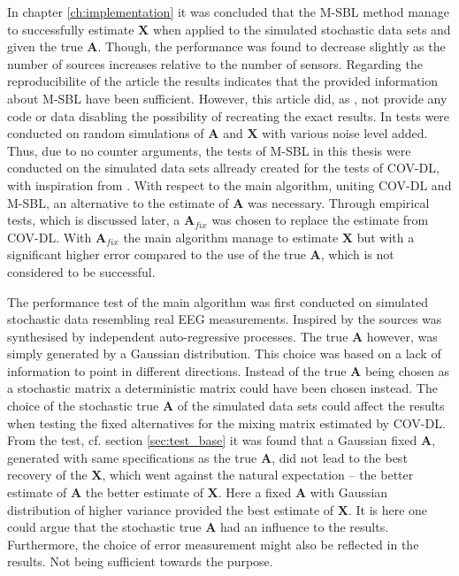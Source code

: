 In chapter \ref{ch:implementation} it was concluded that the M-SBL method manage to successfully estimate $\textbf{X}$ when applied to the  simulated stochastic data sets and given the true $\textbf{A}$. Though, the performance was found to decrease slightly as the number of sources increases relative to the number of sensors.   
Regarding the reproducibilite of the article \cite{Balkan2014} the results indicates that the provided information about M-SBL have been sufficient.
However, this article did, as \cite{Balkan2015}, not provide any code or data disabling the possibility of recreating the exact results. In \cite{Balkan2014} tests were conducted on random simulations of $\textbf{A}$ and $\textbf{X}$ with various noise level added.   
Thus, due to no counter arguments, the tests of M-SBL in this thesis were conducted on the simulated data sets allready created for the tests of COV-DL, with inspiration from \cite{Balkan2014}.
With respect to the main algorithm, uniting COV-DL and M-SBL, an alternative to the estimate of $\textbf{A}$ was necessary. 
Through empirical tests, which is discussed later, a $\textbf{A}_{fix}$ was chosen to replace the estimate from COV-DL. 
With $\textbf{A}_{fix}$ the main algorithm manage to estimate $\textbf{X}$ but with a significant higher error compared to the use of the true $\textbf{A}$, which is not considered to be successful.

The performance test of the main algorithm was first conducted on simulated stochastic data resembling real EEG measurements. 
Inspired by \cite{Balkan2015} the sources was synthesised by independent auto-regressive processes. 
The true $\textbf{A}$ however, was simply generated by a Gaussian distribution. 
This choice was based on a lack of information to point in different directions. 
Instead of the true $\textbf{A}$ being chosen as a stochastic matrix a deterministic matrix could have been chosen instead. 
The choice of the stochastic true $\textbf{A}$ of the simulated data sets could affect the results when testing the fixed alternatives for the mixing matrix estimated by COV-DL. 
From the test, cf. section \ref{sec:test_base} it was found that a Gaussian fixed $\textbf{A}$, generated with same specifications as the true $\textbf{A}$, did not lead to the best recovery of the $\textbf{X}$, which went against the natural expectation -- the better estimate of $\textbf{A}$ the better estimate of $\textbf{X}$. Here a fixed $\textbf{A}$ with Gaussian distribution of higher variance provided the best estimate of $\textbf{X}$. It is here one could argue that the stochastic true $\textbf{A}$ had an influence to the results.      
Furthermore, the choice of error measurement might also be reflected in the results. Not being sufficient towards the purpose. 

